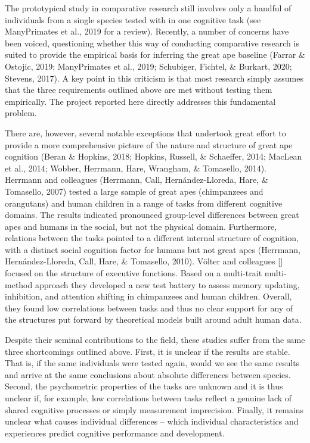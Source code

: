 \documentclass[
  man,floatsintext]{apa6}
\begin{document}
The prototypical study in comparative research still involves only a handful of individuals from a single species tested with in one cognitive task (see ManyPrimates et al., 2019 for a review). Recently, a number of concerns have been voiced, questioning whether this way of conducting comparative research is suited to provide the empirical basis for inferring the great ape baseline (Farrar \& Ostojic, 2019; ManyPrimates et al., 2019; Schubiger, Fichtel, \& Burkart, 2020; Stevens, 2017). A key point in this criticism is that most research simply assumes that the three requirements outlined above are met without testing them empirically. The project reported here directly addresses this fundamental problem.

There are, however, several notable exceptions that undertook great effort to provide a more comprehensive picture of the nature and structure of great ape cognition (Beran \& Hopkins, 2018; Hopkins, Russell, \& Schaeffer, 2014; MacLean et al., 2014; Wobber, Herrmann, Hare, Wrangham, \& Tomasello, 2014). Herrmann and colleagues (Herrmann, Call, Hernández-Lloreda, Hare, \& Tomasello, 2007) tested a large sample of great apes (chimpanzees and orangutans) and human children in a range of tasks from different cognitive domains. The results indicated pronounced group-level differences between great apes and humans in the social, but not the physical domain. Furthermore, relations between the tasks pointed to a different internal structure of cognition, with a distinct social cognition factor for humans but not great apes (Herrmann, Hernández-Lloreda, Call, Hare, \& Tomasello, 2010). Völter and colleagues {[}{]} focused on the structure of executive functions. Based on a multi-trait multi-method approach they developed a new test battery to assess memory updating, inhibition, and attention shifting in chimpanzees and human children. Overall, they found low correlations between tasks and thus no clear support for any of the structures put forward by theoretical models built around adult human data.

Despite their seminal contributions to the field, these studies suffer from the same three shortcomings outlined above. First, it is unclear if the results are stable. That is, if the same individuals were tested again, would we see the same results and arrive at the same conclusions about absolute differences between species. Second, the psychometric properties of the tasks are unknown and it is thus unclear if, for example, low correlations between tasks reflect a genuine lack of shared cognitive processes or simply measurement imprecision. Finally, it remains unclear what causes individual differences -- which individual characteristics and experiences predict cognitive performance and development.
\end{document}
